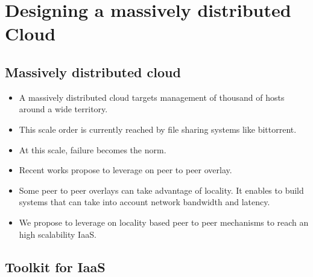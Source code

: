 \section{Designing a massively distributed Cloud}
\label{sec:design}

\subsection{Massively distributed cloud}

\begin{itemize}

	\item A massively distributed cloud targets management of thousand of hosts 
	around a wide territory.

	\item This scale order is currently reached by file sharing systems like 
	bittorrent.

	\item At this scale, failure becomes the norm.

	\item Recent works propose to leverage on peer to peer overlay.

	\item Some peer to peer overlays can take advantage of locality. It enables
	to build systems that can take into account network bandwidth and latency.

	\item We propose to leverage on locality based peer to peer mechanisms to 
	reach an high scalability IaaS.

\end{itemize}

\subsection{Toolkit for IaaS}

